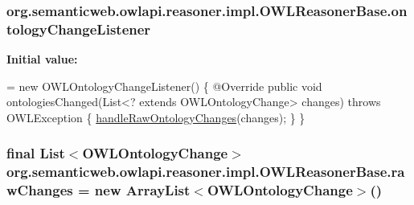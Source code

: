 \hypertarget{classorg_1_1semanticweb_1_1owlapi_1_1reasoner_1_1impl_1_1_o_w_l_reasoner_base_a92d26af9ab3ec3d9a65f32abb95631bb}{
\subsubsection[{ontology\-Change\-Listener}]{ org.\-semanticweb.\-owlapi.\-reasoner.\-impl.\-O\-W\-L\-Reasoner\-Base.\-ontology\-Change\-Listener\hspace{0.3cm}{\ttfamily [private]}}}\label{classorg_1_1semanticweb_1_1owlapi_1_1reasoner_1_1impl_1_1_o_w_l_reasoner_base_a92d26af9ab3ec3d9a65f32abb95631bb}
{\bfseries Initial value\-:}
\begin{DoxyCode}
= \textcolor{keyword}{new} OWLOntologyChangeListener() \{
        @Override
        \textcolor{keyword}{public} \textcolor{keywordtype}{void} ontologiesChanged(List<? extends OWLOntologyChange> changes) \textcolor{keywordflow}{throws} OWLException \{
            \hyperlink{classorg_1_1semanticweb_1_1owlapi_1_1reasoner_1_1impl_1_1_o_w_l_reasoner_base_a5c9d48b73196f8463aea8689fb9e6beb}{handleRawOntologyChanges}(changes);
        \}
    \}
\end{DoxyCode}
\hypertarget{classorg_1_1semanticweb_1_1owlapi_1_1reasoner_1_1impl_1_1_o_w_l_reasoner_base_a88633d3c0db97fcf0f3b6c52ea361be0}{
\subsubsection[{raw\-Changes}]{\setlength{\rightskip}{0pt plus 5cm}final List$<${\bf O\-W\-L\-Ontology\-Change}$>$ org.\-semanticweb.\-owlapi.\-reasoner.\-impl.\-O\-W\-L\-Reasoner\-Base.\-raw\-Changes = new Array\-List$<${\bf O\-W\-L\-Ontology\-Change}$>$()\hspace{0.3cm}{\ttfamily [private]}}}\label{classorg_1_1semanticweb_1_1owlapi_1_1reasoner_1_1impl_1_1_o_w_l_reasoner_base_a88633d3c0db97fcf0f3b6c52ea361be0}
